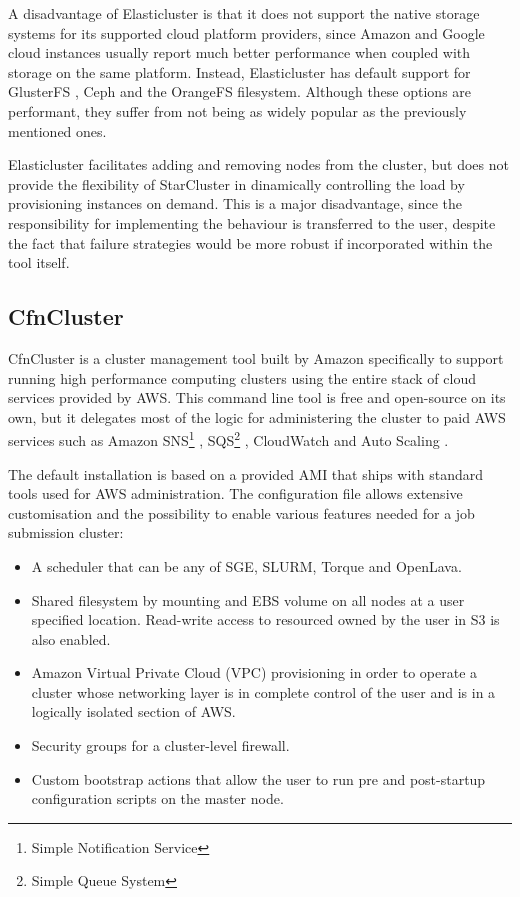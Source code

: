 A disadvantage of Elasticluster is that it does not support the native storage systems for its supported cloud platform providers, since Amazon and Google cloud instances usually report much better performance when coupled with storage on the same platform. Instead, Elasticluster has default support for GlusterFS \cite{GlusterFS}, Ceph \cite{Ceph} and the OrangeFS \cite{OrangeFS} filesystem. Although these options are performant, they suffer from not being as widely popular as the previously mentioned ones.

Elasticluster facilitates adding and removing nodes from the cluster, but does not provide the flexibility of StarCluster in dinamically controlling the load by provisioning instances on demand. This is a major disadvantage, since the responsibility for implementing the behaviour is transferred to the user, despite the fact that failure strategies would be more robust if incorporated within the tool itself.

\subsection{CfnCluster}

CfnCluster is a cluster management tool built by Amazon specifically to support running high performance computing  clusters using the entire stack of cloud services provided by AWS. This command line tool is free and open-source on its own, but it delegates most of the logic for administering the cluster to paid AWS services such as Amazon SNS\footnote{Simple Notification Service} \cite{SNS}, SQS\footnote{Simple Queue System} \cite{SQS}, CloudWatch \cite{CloudWatch} and Auto Scaling \cite{AutoScaling}.

The default installation is based on a provided AMI that ships with standard tools used for AWS administration. The configuration file allows extensive customisation and the possibility to enable various features needed for a job submission cluster:
\begin{itemize}
	\item A scheduler that can be any of SGE, SLURM, Torque and OpenLava\cite{OpenLava}.
	\item Shared filesystem by mounting and EBS volume on all nodes at a user specified location. Read-write access to resourced owned by the user in S3 is also enabled.
	\item Amazon Virtual Private Cloud (VPC) provisioning in order to operate a cluster whose networking layer is in complete control of the user and is in a logically isolated section of AWS.
	\item Security groups for a cluster-level firewall.
	\item Custom bootstrap actions that allow the user to run pre and post-startup configuration scripts on the master node.
\end{itemize}

